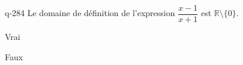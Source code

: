 \begin{truefalse}{q-284}
Le domaine de définition de l'expression $\dfrac{x-1}{x+1}$ est $\mathbb R \setminus \{0\}$.
\item Vrai
\item* Faux
\end{truefalse}

